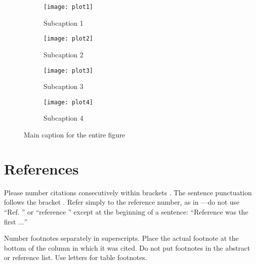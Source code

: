 \begin{figure}[ht]
  \centering

  \begin{subfigure}{0.45\linewidth}
    \texttt{[image: plot1]}
    \caption{Subcaption 1}
    \label{fig:subfig1}
  \end{subfigure}

  \vspace{0.5cm}

  \begin{subfigure}{0.45\linewidth}
    \texttt{[image: plot2]}
    \caption{Subcaption 2}
    \label{fig:subfig2}
  \end{subfigure}

  \vspace{0.5cm}

  \begin{subfigure}{0.45\linewidth}
    \texttt{[image: plot3]}
    \caption{Subcaption 3}
    \label{fig:subfig3}
  \end{subfigure}

  \vspace{0.5cm}

  \begin{subfigure}{0.45\linewidth}
    \texttt{[image: plot4]}
    \caption{Subcaption 4}
    \label{fig:subfig4}
  \end{subfigure}

  \caption{Main caption for the entire figure}
  \label{fig:mainfigure}
\end{figure}










\section*{References}

Please number citations consecutively within brackets \cite{b1}. The 
sentence punctuation follows the bracket \cite{b2}. Refer simply to the reference 
number, as in \cite{b3}---do not use ``Ref. \cite{b3}'' or ``reference \cite{b3}'' except at 
the beginning of a sentence: ``Reference \cite{b3} was the first $\ldots$''

Number footnotes separately in superscripts. Place the actual footnote at 
the bottom of the column in which it was cited. Do not put footnotes in the 
abstract or reference list. Use letters for table footnotes.
